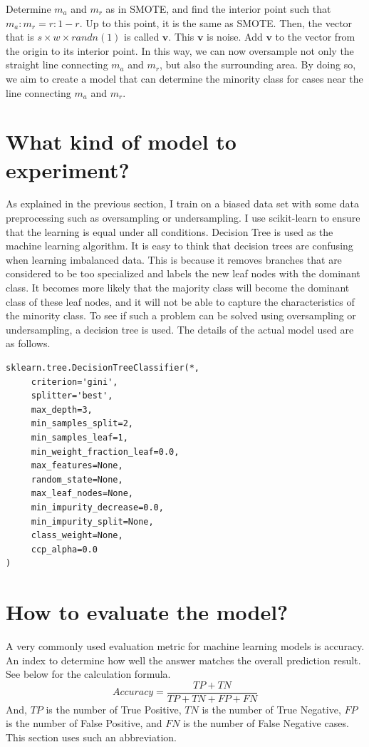 Determine $m_a$ and $m_r$ as in SMOTE, and find the interior point such that $m_a:m_r=r:1-r$.
Up to this point, it is the same as SMOTE.
Then, the vector that is $s \times w \times randn(1)$ is called $\bm{v}$.
This $\bm{v}$ is noise.
Add $\bm{v}$ to the vector from the origin to its interior point.
In this way, we can now oversample not only the straight line connecting $m_a$ and $m_r$, but also the surrounding area.
By doing so, we aim to create a model that can determine the minority class for cases near the line connecting $m_a$ and $m_r$.

\section{What kind of model to experiment?}
As explained in the previous section, I train on a biased data set with some data preprocessing such as oversampling or undersampling.
I use scikit-learn to ensure that the learning is equal under all conditions. Decision Tree is used as the machine learning algorithm.
It is easy to think that decision trees are confusing when learning imbalanced data. This is because it removes branches that are considered to be too specialized and labels the new leaf nodes with the dominant class.
It becomes more likely that the majority class will become the dominant class of these leaf nodes, and it will not be able to capture the characteristics of the minority class.
To see if such a problem can be solved using oversampling or undersampling, a decision tree is used.
The details of the actual model used are as follows.

\begin{lstlisting}[caption=DecisionTreeClassifier,label=DecisionTreeClassifier]
sklearn.tree.DecisionTreeClassifier(*,
     criterion='gini',
     splitter='best',
     max_depth=3,
     min_samples_split=2,
     min_samples_leaf=1,
     min_weight_fraction_leaf=0.0,
     max_features=None,
     random_state=None,
     max_leaf_nodes=None,
     min_impurity_decrease=0.0,
     min_impurity_split=None,
     class_weight=None,
     ccp_alpha=0.0
)
\end{lstlisting}


\section{How to evaluate the model?}
A very commonly used evaluation metric for machine learning models is accuracy.
An index to determine how well the answer matches the overall prediction result. See below for the calculation formula.
$$
Accuracy = \frac{TP + TN}{TP + TN + FP + FN}
$$
And, $TP$ is the number of True Positive, $TN$ is the number of True Negative, $FP$ is the number of False Positive, and $FN$ is the number of False Negative cases. This section uses such an abbreviation.

